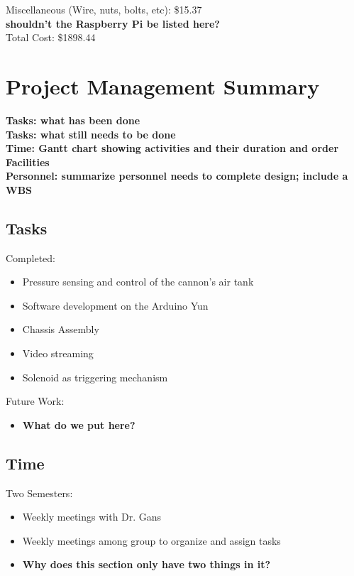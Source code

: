 \documentclass[letterpaper,12pt]{article}
\newcommand{\xxx}[1]{{\color{red}\bf #1}}
\begin{document}
Miscellaneous (Wire, nuts, bolts, etc): \$15.37 \\

\xxx{shouldn't the Raspberry Pi be listed here?}\\

Total Cost: \$1898.44

\section{Project Management Summary}
\label{sec:projman}

\xxx{Tasks: what has been done} \\
\xxx{Tasks: what still needs to be done} \\
\xxx{Time: Gantt chart showing activities and their duration and order} \\
\xxx{Facilities} \\
\xxx{Personnel: summarize personnel needs to complete design; include a WBS}

\subsection{Tasks}
Completed:
\begin{itemize}
\item Pressure sensing and control of the cannon's air tank
\item Software development on the Arduino Yun
\item Chassis Assembly
\item Video streaming
\item Solenoid as triggering mechanism
\end{itemize}

Future Work:
\begin{itemize}
\item \xxx{What do we put here?}
\end{itemize}

\subsection{Time}
Two Semesters:
\begin{itemize}
\item Weekly meetings with Dr. Gans
\item Weekly meetings among group to organize and assign tasks
\item \xxx{Why does this section only have two things in it?}
\end{itemize}
\end{document}
